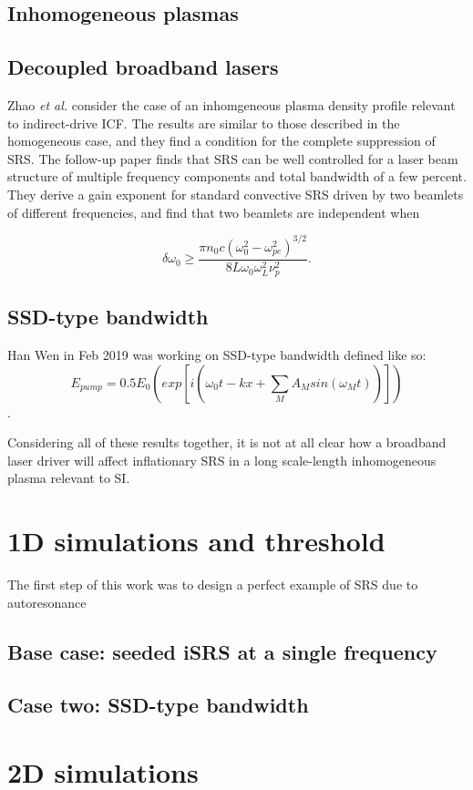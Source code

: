 \subsection{Inhomogeneous plasmas}


\subsection{Decoupled broadband lasers}
Zhao \textit{et al.} \cite{zhao_effective_2017} consider the case of an
inhomgeneous plasma density profile relevant to indirect-drive ICF. The results
are similar to those described in the homogeneous case, and they find a
condition for the complete suppression of SRS. The follow-up paper
\cite{zhao_suppression_2019} finds that SRS can be well controlled for a laser
beam structure of multiple frequency components and total bandwidth of a few
percent. They derive a gain exponent for standard convective SRS driven by two
beamlets of different frequencies, and find that two beamlets are independent
when

\begin{equation}\label{DLB_threshold_inhomo}
\delta \omega_{0} \geq \frac{\pi n_{0} c\left(\omega_{0}^{2}-\omega_{p e}^{2}\right)^{3 / 2}}{8 L \omega_{0} \omega_{L}^{2} \nu_{p}^{2}}.
\end{equation}



\subsection{SSD-type bandwidth}
 Han Wen in Feb 2019 was working on SSD-type bandwidth defined like so:
 $$E_{pump} = 0.5E_0\left(exp[i(\omega_0t-kx+\sum_MA_Msin(\omega_Mt))]\right)$$.

Considering all of these results together, it is not at all clear how a
broadband laser driver will affect inflationary SRS in a long scale-length
inhomogeneous plasma relevant to SI.

\section{1D simulations and threshold}
The first step of this work was to design a perfect example of SRS due to
autoresonance

\subsection{Base case: seeded iSRS at a single frequency}

\subsection{Case two: SSD-type bandwidth}
\section{2D simulations}





